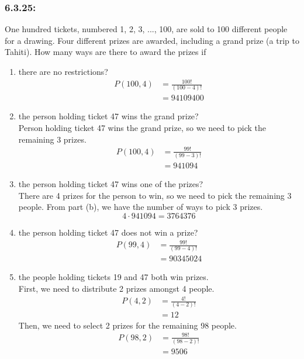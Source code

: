 \documentclass[a4paper]{article}
\begin{document}
	\subsubsection*{6.3.25:}
	One hundred tickets, numbered 1, 2, 3, ..., 100, are sold to 100 different people for a drawing. Four different prizes are awarded, including a grand prize (a trip to Tahiti). How many ways are there to award the prizes if
	\begin{enumerate}[label = \textbf{\alph*)}]
		\item there are no restrictions?
		\begin{align*}
		P(100,4) & = \frac{100!}{(100-4)!} \\
		& = 94109400
		\end{align*}
		\item the person holding ticket 47 wins the grand prize? \\
		Person holding ticket 47 wins the grand prize, so we need to pick the remaining 3 prizes.
		\begin{align*}
		P(100,4) & = \frac{99!}{(99-3)!} \\
		& = 941094
		\end{align*}
		\item the person holding ticket 47 wins one of the prizes? \\
		There are 4 prizes for the person to win, so we need to pick the remaining 3 people. From part (b), we have the number of ways to pick 3 prizes.
		\begin{equation*}
		4 \cdot 941094 = 3764376
		\end{equation*}
		\item the person holding ticket 47 does not win a prize?
		\begin{align*}
		P(99,4) & = \frac{99!}{(99-4)!} \\
		& = 90345024
		\end{align*}
		\item the people holding tickets 19 and 47 both win prizes. \\
		First, we need to distribute 2 prizes amongst 4 people.
		\begin{align*}
		P(4,2) & = \frac{4!}{(4-2)!} \\
		& = 12
		\end{align*}
		Then, we need to select 2 prizes for the remaining 98 people.
		\begin{align*}
		P(98,2) & = \frac{98!}{(98-2)!} \\
		& = 9506
		\end{align*}

\end{enumerate}
\end{document}
